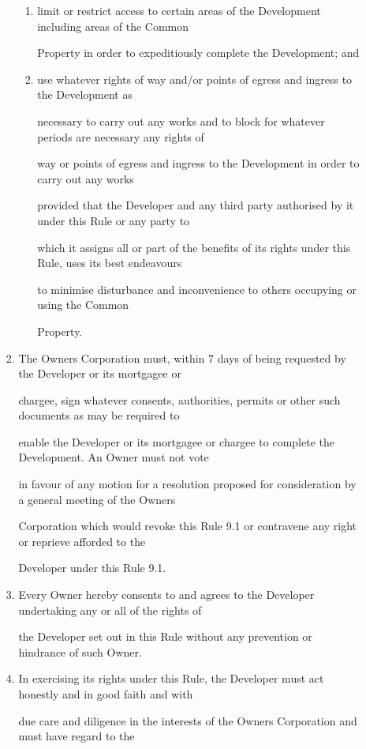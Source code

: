 \documentclass{article}
\begin{document}
\begin{enumerate}[label=\arabic*.]
\begin{enumerate}[label=\arabic{enumi}.\arabic*.]
\begin{enumerate}[label=(\arabic*)]
\begin{enumerate}[label=(\alph*)]
\item  limit or restrict access to certain areas of the Development including areas of the Common 

Property in order to expeditiously complete the Development; and 

\item  use whatever rights of way and/or points of egress and ingress to the Development as 

necessary to carry out any works and to block for whatever periods are necessary any rights of 

way or points of egress and ingress to the Development in order to carry out any works 

provided that the Developer and any third party authorised by it under this Rule or any party to 

which it assigns all or part of the benefits of its rights under this Rule, uses its best endeavours 

to minimise disturbance and inconvenience to others occupying or using the Common 

Property. 

\end{enumerate}
\item  The Owners Corporation must, within 7 days of being requested by the Developer or its mortgagee or 

chargee, sign whatever consents, authorities, permits or other such documents as may be required to 

enable the Developer or its mortgagee or chargee to complete the Development. An Owner must not vote 

in favour of any motion for a resolution proposed for consideration by a general meeting of the Owners 

Corporation which would revoke this Rule 9.1 or contravene any right or reprieve afforded to the 

Developer under this Rule 9.1. 

\item  Every Owner hereby consents to and agrees to the Developer undertaking any or all of the rights of 

the Developer set out in this Rule without any prevention or hindrance of such Owner. 

\item  In exercising its rights under this Rule, the Developer must act honestly and in good faith and with 

due care and diligence in the interests of the Owners Corporation and must have regard to the 


\end{enumerate}
\end{enumerate}
\end{enumerate}
\end{document}
